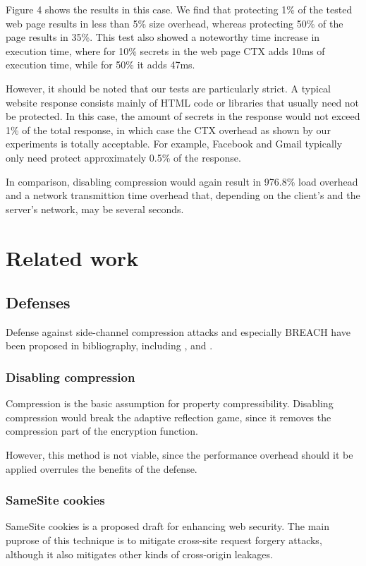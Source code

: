 \documentclass[conference, letterpaper, 10pt]{IEEEtran}
\begin{document}
Figure 4 shows the results in this case. We find that protecting 1\% of the
tested web page results in less than 5\% size overhead, whereas protecting 50\% of
the page results in 35\%. This test also showed a noteworthy time increase in
execution time, where for 10\% secrets in the web page CTX adds 10ms of
execution time, while for 50\% it adds 47ms.

However, it should be noted that our tests are particularly strict. A typical
website response consists mainly of HTML code or libraries that usually need not
be protected. In this case, the amount of secrets in the response would not
exceed 1\% of the total response, in which case the CTX overhead as shown by our
experiments is totally acceptable. For example, Facebook and Gmail typically
only need protect approximately 0.5\% of the response.

In comparison, disabling compression would again result in 976.8\% load overhead
and a network transmittion time overhead that, depending on the client's and the
server's network, may be several seconds.

\section{Related work}\label{sec:related}

\subsection{Defenses}

Defense against side-channel compression attacks and especially BREACH have been
proposed in bibliography, including \cite{c3}, \cite{c5} and \cite{c6}.

\subsubsection{Disabling compression}\label{subsec:disablecom}
Compression is the basic assumption for property compressibility. Disabling
compression would break the adaptive reflection game, since it removes
the compression part of the encryption function.

However, this method is not viable, since the performance overhead should it be
applied overrules the benefits of the defense.

\subsubsection{SameSite cookies}\label{subsec:samesite}
SameSite cookies \cite{c10} is a proposed draft for enhancing web security. The
main puprose of this technique is to mitigate cross-site request forgery
attacks, although it also mitigates other kinds of cross-origin leakages.
\end{document}
